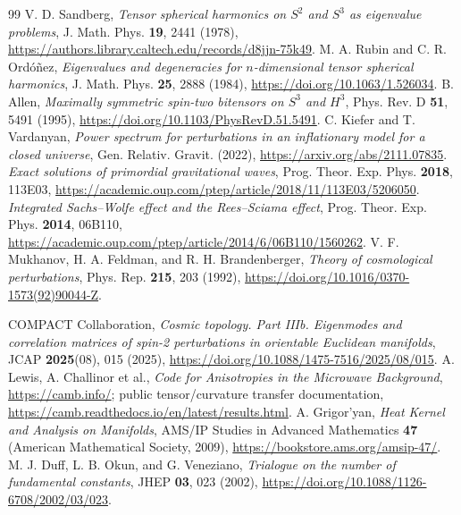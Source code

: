 \documentclass[aps,prd,onecolumn,notitlepage,groupedaddress,11pt]{revtex4-2}
\begin{document}
\begin{thebibliography}{99}
 V. D. Sandberg, \emph{Tensor spherical harmonics on $S^2$ and $S^3$ as eigenvalue problems}, J. Math. Phys. \textbf{19}, 2441 (1978), \url{https://authors.library.caltech.edu/records/d8jjn-75k49}.
 M. A. Rubin and C. R. Ord\'o\~nez, \emph{Eigenvalues and degeneracies for $n$-dimensional tensor spherical harmonics}, J. Math. Phys. \textbf{25}, 2888 (1984), \url{https://doi.org/10.1063/1.526034}.
 B. Allen, \emph{Maximally symmetric spin-two bitensors on $S^3$ and $H^3$}, Phys. Rev. D \textbf{51}, 5491 (1995), \url{https://doi.org/10.1103/PhysRevD.51.5491}.
 C. Kiefer and T. Vardanyan, \emph{Power spectrum for perturbations in an inflationary model for a closed universe}, Gen. Relativ. Gravit. (2022), \url{https://arxiv.org/abs/2111.07835}.
 \emph{Exact solutions of primordial gravitational waves}, Prog. Theor. Exp. Phys. \textbf{2018}, 113E03, \url{https://academic.oup.com/ptep/article/2018/11/113E03/5206050}.
 \emph{Integrated Sachs--Wolfe effect and the Rees--Sciama effect}, Prog. Theor. Exp. Phys. \textbf{2014}, 06B110, \url{https://academic.oup.com/ptep/article/2014/6/06B110/1560262}.
 V. F. Mukhanov, H. A. Feldman, and R. H. Brandenberger, \emph{Theory of cosmological perturbations}, Phys. Rep. \textbf{215}, 203 (1992), \url{https://doi.org/10.1016/0370-1573(92)90044-Z}.

 COMPACT Collaboration, \emph{Cosmic topology. Part IIIb. Eigenmodes and correlation matrices of spin-2 perturbations in orientable Euclidean manifolds}, JCAP \textbf{2025}(08), 015 (2025), \url{https://doi.org/10.1088/1475-7516/2025/08/015}.
 A. Lewis, A. Challinor et al., \emph{Code for Anisotropies in the Microwave Background}, \url{https://camb.info/}; public tensor/curvature transfer documentation, \url{https://camb.readthedocs.io/en/latest/results.html}.
 A. Grigor'yan, \emph{Heat Kernel and Analysis on Manifolds}, AMS/IP Studies in Advanced Mathematics \textbf{47} (American Mathematical Society, 2009), \url{https://bookstore.ams.org/amsip-47/}.
 M. J. Duff, L. B. Okun, and G. Veneziano, \emph{Trialogue on the number of fundamental constants}, JHEP \textbf{03}, 023 (2002), \url{https://doi.org/10.1088/1126-6708/2002/03/023}.
\end{thebibliography}
\end{document}
